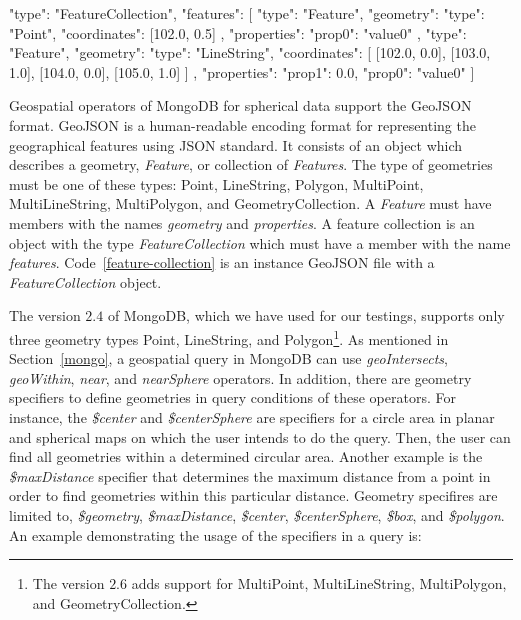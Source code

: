 \documentclass[a4paper,12pt]{article}
\begin{document}
\vspace{10px}
\begin{fakeXML}[label=feature-collection,caption=A GeoJSON file containing a \textit{FeatureCollection} object]
{
  "type": "FeatureCollection",
  "features": [
    {
      "type": "Feature",
      "geometry": {
        "type": "Point",
        "coordinates": [102.0, 0.5]
      },
      "properties": {
        "prop0": "value0"
      }
    },
    {
      "type": "Feature",
      "geometry": {
        "type": "LineString",
        "coordinates": [
          [102.0, 0.0], [103.0, 1.0], [104.0, 0.0], [105.0, 1.0]
        ]
      },
      "properties": {
        "prop1": 0.0,
        "prop0": "value0"
      }
    }
  ]
}
\end{fakeXML}
\vspace{10px}


Geospatial operators of MongoDB for spherical data support the GeoJSON~\cite{www/geojson} format. GeoJSON is a human-readable encoding format for representing the geographical features using JSON standard. It consists of an object which describes a geometry, \textit{Feature}, or collection of \textit{Features}. The type of geometries must be one of these types: Point, Line\-String, Polygon, Multi\-Point, Multi\-Line\-String, MultiPolygon, and Geometry\-Collection. A \textit{Feature} must have members with the names \textit{geometry} and \textit{properties}. A feature collection is an object with the type \textit{FeatureCollection} which must have a member with the name \textit{features}. Code~\ref{feature-collection} is an instance GeoJSON file with a \textit{FeatureCollection} object.

The version $2.4$ of MongoDB, which we have used for our testings, supports only three geometry types Point, Line\-String, and Polygon\footnote{The version $2.6$ adds support for Multi\-Point, Multi\-Line\-String, Multi\-Polygon, and Geometry\-Collection.}. As mentioned in Section~\ref{mongo}, a geospatial query in MongoDB can use \textit{geoIntersects}, \textit{geoWithin}, \textit{near}, and \textit{nearSphere} operators. In addition, there are geometry specifiers to define geometries in query conditions of these operators. For instance, the \textit{\$center} and \textit{\$centerSphere} are specifiers for a circle area in planar and spherical maps on which the user intends to do the query. Then, the user can find all geometries within a determined circular area. Another example is the \textit{\$maxDistance} specifier that determines the maximum distance from a point in order to find geometries within this particular distance. Geometry specifires are limited to, \textit{\$geometry}, \textit{\$maxDistance}, \textit{\$center}, \textit{\$centerSphere}, \textit{\$box}, and \textit{\$polygon}. An example demonstrating the usage of the specifiers in a query is:
\vspace{10px}
 \vspace{10px}
 
\end{document}
